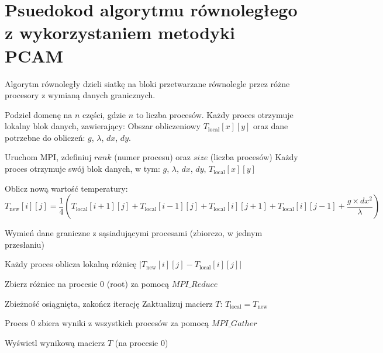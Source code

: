\documentclass{article}
\begin{document}
\section*{Psuedokod algorytmu równoległego z wykorzystaniem metodyki PCAM}
Algorytm równoległy dzieli siatkę na bloki przetwarzane równolegle przez różne procesory z wymianą danych granicznych.

\begin{algorithm}[H]
\caption{Algorytm równoległy (metoda różnic skończonych z MPI)}
\begin{algorithmic}[1]
    \STATE Podziel domenę na $n$ części, gdzie $n$ to liczba procesów.
    \STATE Każdy proces otrzymuje lokalny blok danych, zawierający:
    \STATE \quad Obszar obliczeniowy $T_{\text{local}}[x][y]$ oraz dane potrzebne do obliczeń: $g$, $\lambda$, $dx$, $dy$.
    
    \STATE Uruchom MPI, zdefiniuj $rank$ (numer procesu) oraz $size$ (liczba procesów)
    \STATE Każdy proces otrzymuje swój blok danych, w tym:
    \STATE \quad $g$, $\lambda$, $dx$, $dy$, $T_{\text{local}}[x][y]$
    
    \REPEAT
        \STATE Oblicz nową wartość temperatury:
        \[
        T_{\text{new}}[i][j] = \frac{1}{4} (T_{\text{local}}[i+1][j] + T_{\text{local}}[i-1][j] + T_{\text{local}}[i][j+1] + T_{\text{local}}[i][j-1] + \frac{g \times dx^2}{\lambda})
        \]
    \ENDFOR
    
    \STATE Wymień dane graniczne z sąsiadującymi procesami (zbiorczo, w jednym przesłaniu)
    
    \STATE Każdy proces oblicza lokalną różnicę $|T_{\text{new}}[i][j] - T_{\text{local}}[i][j]|$

    \STATE Zbierz różnice na procesie 0 (root) za pomocą $MPI\_Reduce$
    
    \STATE Zbieżność osiągnięta, zakończ iterację
    \ENDIF
    \STATE Zaktualizuj macierz $T$: $T_{\text{local}} = T_{\text{new}}$
    
    \STATE Proces 0 zbiera wyniki z wszystkich procesów za pomocą $MPI\_Gather$

    \STATE Wyświetl wynikową macierz $T$ (na procesie 0)
    
\end{algorithmic}
\end{algorithm}
\end{document}

